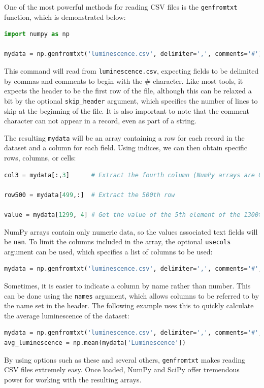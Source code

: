 One of the most powerful methods for reading CSV files is the
\lstinline!genfromtxt! function, which is demonstrated below:

\begin{lstlisting}[language=Python]
import numpy as np

mydata = np.genfromtxt('luminescence.csv', delimiter=',', comments='#')
\end{lstlisting}
This command will read from \lstinline!luminescence.csv!, expecting
fields to be delimited by commas and comments to begin with the \#
character. Like most tools, it expects the header to be the first row of
the file, although this can be relaxed a bit by the optional
\lstinline!skip_header! argument, which specifies the number of lines to
skip at the beginning of the file. It is also important to note that the
comment character can not appear in a record, even as part of a string.

The resulting \lstinline!mydata! will be an array containing a row for
each record in the dataset and a column for each field. Using indices,
we can then obtain specific rows, columns, or cells:

\begin{lstlisting}[language=Python]
col3 = mydata[:,3]      # Extract the fourth column (NumPy arrays are 0-based)

row500 = mydata[499,:]  # Extract the 500th row

value = mydata[1299, 4] # Get the value of the 5th element of the 1300th row
\end{lstlisting}
NumPy arrays contain only numeric data, so the values associated text
fields will be \lstinline!nan!. To limit the columns included in the
array, the optional \lstinline!usecols! argument can be used, which
specifies a list of columns to be used:

\begin{lstlisting}[language=Python]
mydata = np.genfromtxt('luminescence.csv', delimiter=',', comments='#', usecols=(2,3,4,5))
\end{lstlisting}
Sometimes, it is easier to indicate a column by name rather than number.
This can be done using the \lstinline!names! argument, which allows
columns to be referred to by the name set in the header. The following
example uses this to quickly calculate the average luminescence of the
dataset:

\begin{lstlisting}[language=Python]
mydata = np.genfromtxt('luminescence.csv', delimiter=',', comments='#', names=True)
avg_luminescence = np.mean(mydata['Luminescence'])
\end{lstlisting}
By using options such as these and several others,
\lstinline!genfromtxt! makes reading CSV files extremely easy. Once
loaded, NumPy and SciPy offer tremendous power for working with the
resulting arrays.

